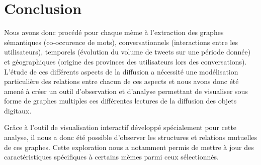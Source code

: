 \chapter*{Conclusion}





Nous avons donc procédé pour chaque mème à l{\textquoteright}extraction des graphes sémantiques (co-occurence de mots), conversationnels (interactions entre les utilisateurs), temporels (évolution du volume de tweets sur une période donnée) et géographiques (origine des provinces des utilisateurs lors des conversations). L{\textquoteright}étude de ces différents aspects de la diffusion a nécessité une modélisation particulière des relations entre chacun de ces aspects et nous avons donc été amené à créer un outil d{\textquoteright}observation et d{\textquoteright}analyse permettant de visualiser sous forme de graphes multiples ces différentes lectures de la diffusion des objets digitaux.  


Gr\^ace à l{\textquoteright}outil de visualisation interactif développé spécialement pour cette analyse, il nous a donc été possible d{\textquoteright}observer les structures et relations mutuelles de ces graphes. Cette exploration nous a notamment permis de mettre à jour des caractéristiques spécifiques à certains mèmes parmi ceux sélectionnés.


